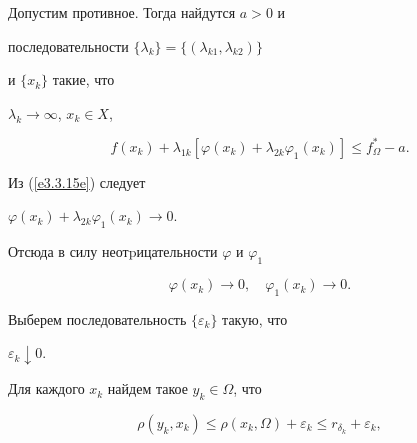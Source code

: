 \begin{pf}


Допустим противное. Тогда найдутся $a>0$ и


последовательности $\{\lambda_{k}\}=\{(\lambda_{k1},\lambda_{k2})\}$


и $\{x_k\}$ такие, что


$\lambda_k\longrightarrow \infty$, $x_k\in X$,


\begin{equation}\label{e3.3.15e}


f(x_k) + \lambda_{1k}[\varphi(x_k)+\lambda_{2k}\varphi_1(x_k)]


\leq f^{*}_{\Omega} - a.




\end{equation}





Из (\ref{e3.3.15e}) следует




$\varphi(x_k)+\lambda_{2k}\varphi_1(x_k)\longrightarrow 0$.




Отсюда в силу неотpицательности $\varphi$ и $\varphi_1$


\begin{equation}\label{e3.3.16ea}


\varphi(x_k)\longrightarrow 0, \quad


\varphi_1(x_k)\longrightarrow 0.


\end{equation}





Выберем последовательность $\{\varepsilon_k\}$ такую, что


$\varepsilon_k\downarrow 0 $.


Для каждого $x_k$ найдем такое $y_k\in \Omega$, что


\begin{equation}\label{e3.3.17e}


\rho(y_k,x_k)\leq \rho(x_k,\Omega) + \varepsilon_k\leq


r_{\delta_k} + \varepsilon_k,




\end{equation}



\end{pf}
